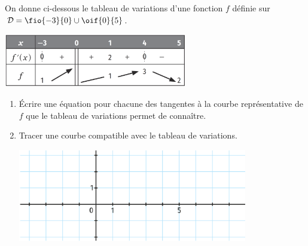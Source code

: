 \documentclass[a4paper,11pt,exos]{nsi} %
\begin{document}
\exo{}
On donne ci-dessous le tableau de variations d'une fonction $f$ définie sur $\mathcal{D}=\fio{-3}{0}\cup\oif{0}{5}$.
\begin{center}
	\includegraphics[width=8cm]{tableau1}
\end{center}
\begin{enumerate}
	\item 	\'Ecrire une équation pour chacune des tangentes à la courbe représentative de $f$ que le tableau de variations permet de connaître.
	\item 	Tracer une courbe compatible avec le tableau de variations.	
	\begin{center}
		\includegraphics[width=10cm]{courbe6}
	\end{center}
\end{enumerate}
\end{document}
